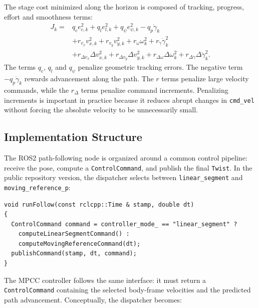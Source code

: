 The stage cost minimized along the horizon is composed of tracking, progress,
effort and smoothness terms:
\begin{equation}
\begin{aligned}
    J_k =&
    q_c e_{c,k}^{2}
    + q_l e_{l,k}^{2}
    + q_{\psi} e_{\psi,k}^{2}
    - q_p \dot{\gamma}_k \\
    &+ r_{v_x} v_{x,k}^{2}
    + r_{v_y} v_{y,k}^{2}
    + r_{\omega} \omega_k^{2}
    + r_{\dot{\gamma}} \dot{\gamma}_k^{2} \\
    &+ r_{\Delta v_x}\Delta v_{x,k}^{2}
    + r_{\Delta v_y}\Delta v_{y,k}^{2}
    + r_{\Delta\omega}\Delta\omega_k^{2}
    + r_{\Delta\dot{\gamma}}\Delta\dot{\gamma}_k^{2}.
\end{aligned}
\end{equation}
The terms \(q_c\), \(q_l\) and \(q_{\psi}\) penalize geometric tracking errors.
The negative term \(-q_p\dot{\gamma}_k\) rewards advancement along the path.  The
\(r\) terms penalize large velocity commands, while the \(r_\Delta\) terms
penalize command increments.  Penalizing increments is important in practice
because it reduces abrupt changes in \texttt{cmd\_vel} without forcing the
absolute velocity to be unnecessarily small.  

\subsection{Implementation Structure}

The ROS2 path-following node is organized around a common control pipeline:
receive the pose, compute a \texttt{ControlCommand}, and publish the final
\texttt{Twist}.  In the public repository version, the dispatcher selects between
\texttt{linear\_segment} and \texttt{moving\_reference\_p}:

\begin{verbatim}
void runFollow(const rclcpp::Time & stamp, double dt)
{
  ControlCommand command = controller_mode_ == "linear_segment" ?
    computeLinearSegmentCommand() :
    computeMovingReferenceCommand(dt);
  publishCommand(stamp, dt, command);
}
\end{verbatim}

The MPCC controller follows the same interface: it must return a
\texttt{ControlCommand} containing the selected body-frame velocities and the
predicted path advancement.  Conceptually, the dispatcher becomes:

